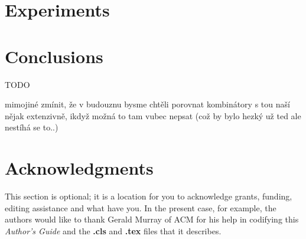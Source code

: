 \documentclass{sig-alternate}
\newenvironment{lizt}
{\begin{easylist}[itemize]}
{\end{easylist}}
\newcommand{\red}[1]{{\color{red} #1}}
\begin{document}
\section{Experiments}
\label{experiments}

\section{Conclusions}
\label{conclusions}

TODO

\red{mimojiné zmínit, že v budouznu bysme chtěli porovnat kombinátory 
s tou naší nějak extenzivně, ikdyž možná to tam vubec nepsat
(což by bylo hezký už ted ale nestíhá se to..)}


\section{Acknowledgments}
This section is optional; it is a location for you
to acknowledge grants, funding, editing assistance and
what have you.  In the present case, for example, the
authors would like to thank Gerald Murray of ACM for
his help in codifying this \textit{Author's Guide}
and the \textbf{.cls} and \textbf{.tex} files that it describes.

\end{document}
